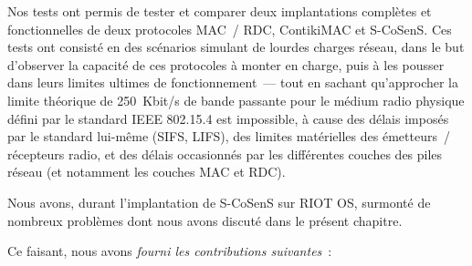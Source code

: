 Nos tests ont permis de tester et comparer deux implantations complètes
et fonctionnelles de deux protocoles MAC~/ RDC, ContikiMAC et S-CoSenS.
Ces tests ont consisté en des scénarios simulant de lourdes charges
réseau, dans le but d'observer la capacité de ces protocoles à monter
en charge, puis à les pousser dans leurs limites ultimes de fonctionnement~---
tout en sachant qu'approcher la limite théorique de 250~Kbit/s de bande
passante pour le médium radio physique défini par le standard IEEE
802.15.4 est impossible, à cause des délais imposés par le standard
lui-même (SIFS, LIFS), des limites matérielles des émetteurs~/ récepteurs
radio, et des délais occasionnés par les différentes couches des piles
réseau (et notamment les couches MAC et RDC).

Nous avons, durant l'implantation de S-CoSenS sur RIOT OS, surmonté
de nombreux problèmes dont nous avons discuté dans le présent chapitre.

\newpage

Ce faisant, nous avons \emph{fourni les contributions suivantes}~:

